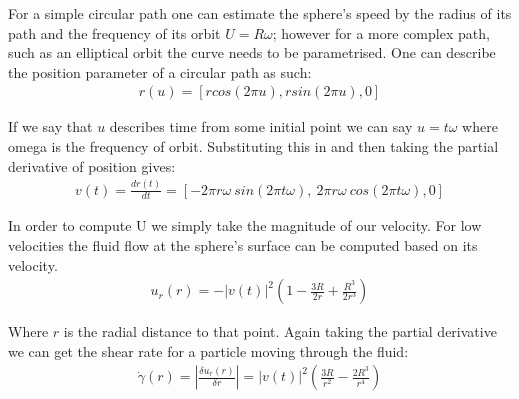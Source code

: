 For a simple circular path one can estimate the sphere's speed by the 
radius of its path and the frequency of its orbit $U = R\omega$; however 
for a more complex path, such as an elliptical orbit the curve needs 
to be parametrised. One can describe the position parameter of a circular 
path as such:
\begin{align}
	r(u) = \left[rcos(2\pi u), rsin(2\pi u), 0 \right]
\end{align}

If we say that $u$ describes time from some initial point we can say $u=t\omega$ 
where omega is the frequency of orbit. Substituting this in and then taking 
the partial derivative of position gives:
\begin{align}
	v(t) = \frac{dr(t)}{dt} = \left[-2\pi r\omega \ sin(2\pi t\omega),
	\ 2\pi r\omega \ cos(2\pi t\omega), 0 \right]
\end{align}

In order to compute U we simply take the magnitude of our velocity. 
For low velocities the fluid flow at the sphere's surface can be computed 
based on its velocity.
\begin{align}
	u_r(r)=-|v(t)|^2\left(1-\frac{3R}{2r}+\frac{R^3}{2r^3}\right)
\end{align}

Where $r$ is the radial distance to that point. Again taking the partial 
derivative we can get the shear rate for a particle moving through the fluid:
\begin{align}
	\dot{\gamma}(r) = \left| \frac{\delta u_r(r)}{\delta r}\right| = |v(t)|^2\left(\frac{3R}{r^2} -\frac{2R^3}{r^4} \right)
	\label{eq:galvo_shear}
\end{align}

